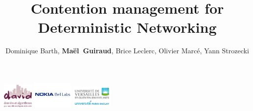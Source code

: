 \documentclass[10 pt]{beamer}
\title{Contention management for Deterministic Networking}
\author{Dominique Barth, {\bf Maël~Guiraud}, Brice Leclerc, Olivier Marcé, Yann Strozecki }
\institute[Nokia Bell Labs, DAVID-UVSQ] 
{
  DAVID, Universit\'e de Versailles Saint Quentin -
  Nokia Bell Labs France \\
}
\begin{document}
\begin{frame}

  \titlepage
  \centering
  \includegraphics [width=15mm]{logod.png} \hspace{1cm} \includegraphics [width=20mm]{logon.png} \hspace{1cm} \includegraphics [width=20mm]{logo.png} \\
\end{frame}
\end{document}

